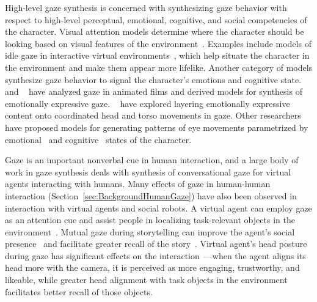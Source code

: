 High-level gaze synthesis is concerned with synthesizing gaze behavior with respect to high-level perceptual, emotional, cognitive, and social competencies of the character. Visual attention models determine where the character should be looking based on visual features of the environment~\citep{peters2003attention}. Examples include models of idle gaze in interactive virtual environments~\citep{khullar2001look,cafaro2009animating,grillon2009crowds}, which help situate the character in the environment and make them appear more lifelike. Another category of models synthesize gaze behavior to signal the character's emotions and cognitive state. ~\citet{queiroz2007automatic} and ~\citet{lance2010expressive} have analyzed gaze in animated films and derived models for synthesis of emotionally expressive gaze. ~\citet{lance2007emotionally} have explored layering emotionally expressive content onto coordinated head and torso movements in gaze. Other researchers have proposed models for generating patterns of eye movements parametrized by emotional~\citet{li2012emotional} and cognitive~\citet{lee2007rickel} states of the character.

Gaze is an important nonverbal cue in human interaction, and a large body of work in gaze synthesis deals with synthesis of conversational gaze for virtual agents interacting with humans. Many effects of gaze in human-human interaction (Section~\ref{sec:BackgroundHumanGaze}) have also been observed in interaction with virtual agents and social robots. A virtual agent can employ gaze as an attention cue and assist people in localizing task-relevant objects in the environment~\citet{bailly2010gaze}. Mutual gaze during storytelling can improve the agent's social presence~\cite{bee2010gaze} and facilitate greater recall of the story~\citet{mutlu2006storytelling}. Virtual agent's head posture during gaze has significant effects on the interaction~\citet{andrist2012designing}---when the agent aligns its head more with the camera, it is perceived as more engaging, trustworthy, and likeable, while greater head alignment with task objects in the environment facilitates better recall of those objects. 